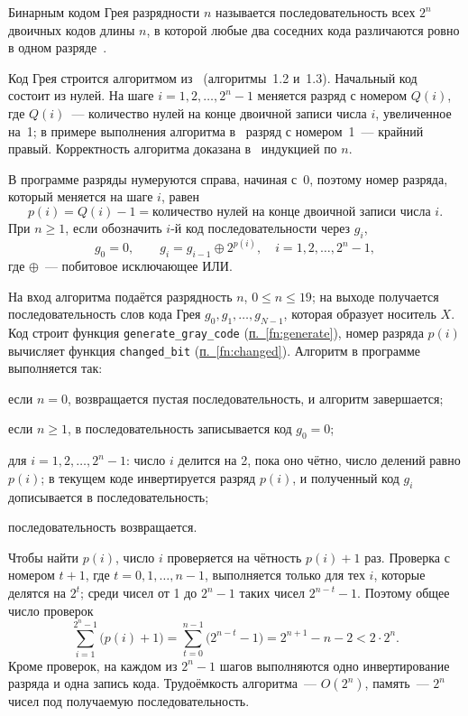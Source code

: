 \documentclass[14pt,a4paper]{extarticle}
\newcommand{\lnk}[2]{\hyperref[#1]{#2~\ref*{#1}}}
\newcommand{\code}[1]{\texttt{#1}}
\newcommand{\us}{\_\allowbreak{}}
\begin{document}
Бинарным кодом Грея разрядности $n$ называется последовательность всех $2^n$ двоичных кодов длины $n$, в которой любые два соседних кода различаются ровно в одном разряде~\cite{novikov}.

Код Грея строится алгоритмом из~\cite{novikov} (алгоритмы~1.2 и~1.3). Начальный код состоит из нулей. На шаге $i = 1, 2, \ldots, 2^n - 1$ меняется разряд с номером $Q(i)$, где $Q(i)$~--- количество нулей на конце двоичной записи числа $i$, увеличенное на~1; в примере выполнения алгоритма в~\cite{novikov} разряд с номером~1~--- крайний правый. Корректность алгоритма доказана в~\cite{novikov} индукцией по $n$.

В программе разряды нумеруются справа, начиная с~0, поэтому номер разряда, который меняется на шаге $i$, равен
\begin{equation}\label{eq:p}
p(i) = Q(i) - 1 = \text{количество нулей на конце двоичной записи числа } i .
\end{equation}
При $n \geqslant 1$, если обозначить $i$-й код последовательности через $g_i$,
\begin{equation}\label{eq:gray}
g_0 = 0, \qquad g_i = g_{i-1} \oplus 2^{p(i)}, \quad i = 1, 2, \ldots, 2^n - 1,
\end{equation}
где $\oplus$~--- побитовое исключающее ИЛИ.

На вход алгоритма подаётся разрядность $n$, $0 \leqslant n \leqslant 19$; на выходе получается последовательность слов кода Грея $g_0, g_1, \ldots, g_{N-1}$, которая образует носитель $X$. Код строит функция \code{generate\us{}gray\us{}code} (\lnk{fn:generate}{п.}), номер разряда $p(i)$ вычисляет функция \code{changed\us{}bit} (\lnk{fn:changed}{п.}). Алгоритм в программе выполняется так:
\begin{steps}
\item если $n = 0$, возвращается пустая последовательность, и алгоритм завершается;
\item если $n \geqslant 1$, в последовательность записывается код $g_0 = 0$;
\item для $i = 1, 2, \ldots, 2^n - 1$: число $i$ делится на 2, пока оно чётно, число делений равно $p(i)$; в текущем коде инвертируется разряд $p(i)$, и полученный код $g_i$ дописывается в последовательность;
\item последовательность возвращается.
\end{steps}

Чтобы найти $p(i)$, число $i$ проверяется на чётность $p(i) + 1$ раз. Проверка с номером $t + 1$, где $t = 0, 1, \ldots, n - 1$, выполняется только для тех $i$, которые делятся на $2^t$; среди чисел от 1 до $2^n - 1$ таких чисел $2^{n-t} - 1$. Поэтому общее число проверок
\begin{equation}\label{eq:cost}
\sum_{i=1}^{2^n - 1} \bigl(p(i) + 1\bigr) = \sum_{t=0}^{n-1} \bigl(2^{n-t} - 1\bigr) = 2^{n+1} - n - 2 < 2 \cdot 2^n.
\end{equation}
Кроме проверок, на каждом из $2^n - 1$ шагов выполняются одно инвертирование разряда и одна запись кода. Трудоёмкость алгоритма~--- $O(2^n)$, память~--- $2^n$ чисел под получаемую последовательность.
\end{document}
